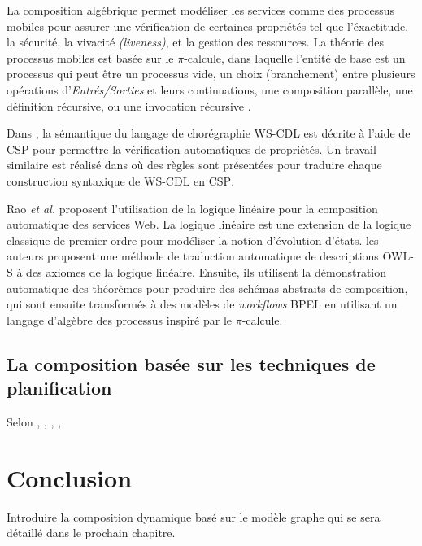     La composition algébrique permet modéliser les services comme des
    processus mobiles pour assurer une vérification de certaines
    propriétés tel que l'éxactitude, la sécurité, la vivacité
    \textit{(liveness)}, et la gestion des ressources. La théorie des
    processus mobiles est basée sur le $\pi$-calcule, dans laquelle
    l'entité de base est un processus qui peut être un processus vide,
    un choix (branchement) entre plusieurs opérations
    d'\textit{Entrés/Sorties} et leurs continuations, une composition
    parallèle, une définition récursive, ou une invocation récursive
    \cite{zahirathesis2008}.

    Dans \cite{koshkina2004modelling}, la sémantique du langage de
    chorégraphie \textsc{WS-CDL} est décrite à l'aide de \textsc{CSP}
    pour permettre la vérification automatiques de propriétés. Un
    travail similaire est réalisé dans \cite{li2007modeling} où des
    règles sont présentées pour traduire chaque construction
    syntaxique de \textsc{WS-CDL} en \textsc{CSP}.

    Rao \textit{et al.} \cite{rao2004logic} proposent l'utilisation de
    la logique linéaire pour la composition automatique des services
    Web. La logique linéaire est une extension de la logique classique
    de premier ordre pour modéliser la notion d'évolution d'états. les
    auteurs proposent une méthode de traduction automatique de
    descriptions \textsc{OWL-S} à des axiomes de la logique
    linéaire. Ensuite, ils utilisent la démonstration automatique des
    théorèmes pour produire des schémas abstraits de composition, qui
    sont ensuite transformés à des modèles de \textit{workflows}
    \textsc{BPEL} en utilisant un langage d'algèbre des processus
    inspiré par le $\pi$-calcule.

    \subsection{La composition basée sur les techniques de planification}
    \label{sec:techn-de-plan}
    Selon \cite{baryannis2010}, \cite{bartalos2011effective},
    \cite{chan2007survey}, \cite{peer2005web}, \cite{rodriguez2011automatic}

  \section{Conclusion}
  \label{sec:conclusion}
  Introduire la composition dynamique basé sur le modèle graphe qui se
  sera détaillé dans le prochain chapitre.

